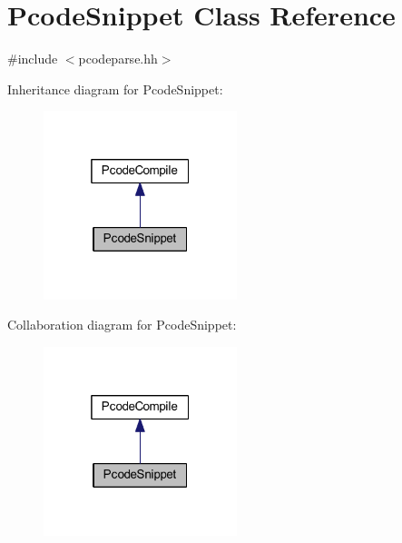 \hypertarget{class_pcode_snippet}{}\section{Pcode\+Snippet Class Reference}
\label{class_pcode_snippet}


{\ttfamily \#include $<$pcodeparse.\+hh$>$}



Inheritance diagram for Pcode\+Snippet\+:
\nopagebreak
\begin{figure}[H]
\begin{center}
\leavevmode
\includegraphics[width=160pt]{class_pcode_snippet__inherit__graph}
\end{center}
\end{figure}


Collaboration diagram for Pcode\+Snippet\+:
\nopagebreak
\begin{figure}[H]
\begin{center}
\leavevmode
\includegraphics[width=160pt]{class_pcode_snippet__coll__graph}
\end{center}
\end{figure}
